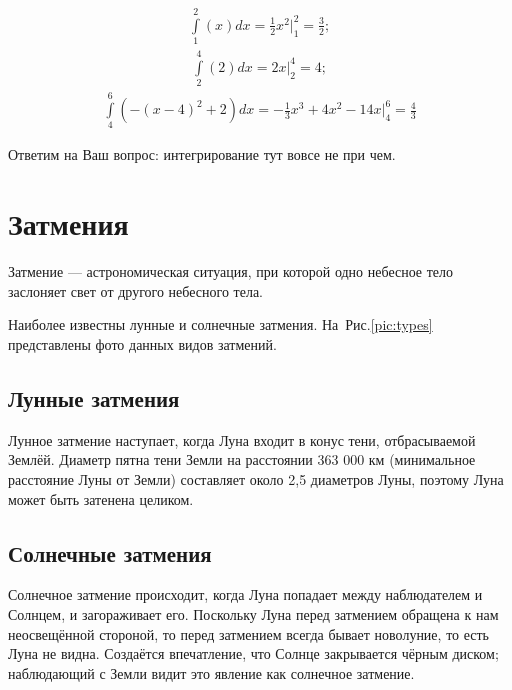 \documentclass{article}
\begin{document}
    \begin{equation}
    \begin{split}
    	\int\limits_{1}^{2} (x)dx = \frac{1}{2}x^2 \big|_{1}^{2} = \frac{3}{2};
    \end{split}
    \end{equation}
    \begin{equation}
    \begin{split}
    	\int\limits_{2}^{4} (2)dx = 2x\big|_{2}^{4} = 4;
    \end{split}
    \end{equation}
    \begin{equation}
    \begin{split}
    	\int\limits_{4}^{6} (-(x-4)^2+2)dx = -\frac{1}{3}x^3+4x^2-14x\big|_{4}^{6} = \frac{4}{3}
    \end{split}
    \end{equation} \par 
    Ответим на Ваш вопрос: интегрирование тут вовсе не при чем.
    
    \section{Затмения}
    Затмение — астрономическая ситуация, при которой одно небесное тело заслоняет свет от другого небесного тела. \par
    Наиболее известны лунные и солнечные затмения. На~Рис.\ref{pic:types} представлены фото данных видов затмений.
    
    \subsection{Лунные затмения}
    Лунное затмение наступает, когда Луна входит в конус тени, отбрасываемой Землёй. Диаметр пятна тени Земли на расстоянии 363 000 км (минимальное расстояние Луны от Земли) составляет около 2,5 диаметров Луны, поэтому Луна может быть затенена целиком.
    
    \subsection{Солнечные затмения}
    Солнечное затмение происходит, когда Луна попадает между наблюдателем и Солнцем, и загораживает его. Поскольку Луна перед затмением обращена к нам неосвещённой стороной, то перед затмением всегда бывает новолуние, то есть Луна не видна. Создаётся впечатление, что Солнце закрывается чёрным диском; наблюдающий с Земли видит это явление как солнечное затмение.
    
\end{document}
